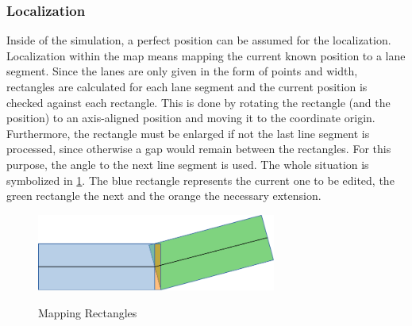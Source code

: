 \documentclass[11pt,oneside,openright]{mpreport}
\begin{document}
\subsubsection{Localization}
Inside of the simulation, a perfect position can be assumed for the localization. Localization within the map means mapping 
the current known position to a lane segment. Since the lanes are only given in the form of points and width, rectangles are calculated
for each lane segment and the current position is checked against each rectangle.
This is done by rotating the rectangle (and the position) to an axis-aligned position and moving it to the coordinate origin. Furthermore, the rectangle must be enlarged if not
the last line segment is processed, since otherwise a gap would remain between the rectangles. For this purpose, the angle to the next line segment is used.
The whole situation is symbolized in \cref{mapping}. The blue rectangle represents the current one to be edited, the green rectangle the next and the orange the necessary extension.
\begin{figure}[!ht]
\begin{center}
\caption{Mapping Rectangles}
\includegraphics[width=0.7\textwidth]{bilder/mapping.pdf}
\label{mapping}
\end{center}
\end{figure}
\end{document}
